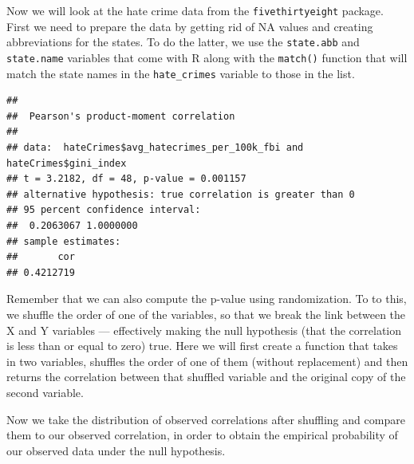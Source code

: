 \documentclass[
  12pt,
]{book}
\newenvironment{Shaded}{\begin{snugshade}}{\end{snugshade}}
\newcommand{\AttributeTok}[1]{\textcolor[rgb]{0.13,0.29,0.53}{#1}}
\newcommand{\CommentTok}[1]{\textcolor[rgb]{0.56,0.35,0.01}{\textit{#1}}}
\newcommand{\FunctionTok}[1]{\textcolor[rgb]{0.13,0.29,0.53}{\textbf{#1}}}
\newcommand{\NormalTok}[1]{#1}
\newcommand{\OtherTok}[1]{\textcolor[rgb]{0.56,0.35,0.01}{#1}}
\newcommand{\SpecialCharTok}[1]{\textcolor[rgb]{0.81,0.36,0.00}{\textbf{#1}}}
\newcommand{\StringTok}[1]{\textcolor[rgb]{0.31,0.60,0.02}{#1}}
\begin{document}
Now we will look at the hate crime data from the \texttt{fivethirtyeight} package. First we need to prepare the data by getting rid of NA values and creating abbreviations for the states. To do the latter, we use the \texttt{state.abb} and \texttt{state.name} variables that come with R along with the \texttt{match()} function that will match the state names in the \texttt{hate\_crimes} variable to those in the list.

\begin{Shaded}
\end{Shaded}

\begin{verbatim}
## 
##  Pearson's product-moment correlation
## 
## data:  hateCrimes$avg_hatecrimes_per_100k_fbi and hateCrimes$gini_index
## t = 3.2182, df = 48, p-value = 0.001157
## alternative hypothesis: true correlation is greater than 0
## 95 percent confidence interval:
##  0.2063067 1.0000000
## sample estimates:
##       cor 
## 0.4212719
\end{verbatim}

Remember that we can also compute the p-value using randomization. To to this, we shuffle the order of one of the variables, so that we break the link between the X and Y variables --- effectively making the null hypothesis (that the correlation is less than or equal to zero) true. Here we will first create a function that takes in two variables, shuffles the order of one of them (without replacement) and then returns the correlation between that shuffled variable and the original copy of the second variable.

Now we take the distribution of observed correlations after shuffling and compare them to our observed correlation, in order to obtain the empirical probability of our observed data under the null hypothesis.
\end{document}
